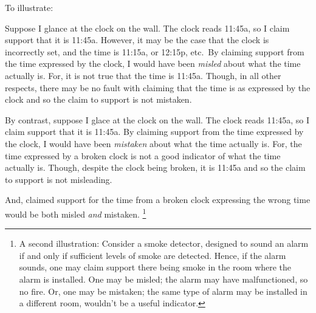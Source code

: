 \begin{note}[M\&M Illustration]
  To illustrate:

  Suppose I glance at the clock on the wall.
  The clock reads 11:45a, so I claim support that it is 11:45a.
  However, it may be the case that the clock is incorrectly set, and the time is 11:15a, or 12:15p, etc.\
  By claiming support from the time expressed by the clock, I would have been \emph{misled} about what the time actually is.
  For, it is not true that the time is 11:45a.
  Though, in all other respects, there may be no fault with claiming that the time is as expressed by the clock and so the claim to support is not mistaken.

  By contrast, suppose I glace at the clock on the wall.
  The clock reads 11:45a, so I claim support that it is 11:45a.
  By claiming support from the time expressed by the clock, I would have been \emph{mistaken} about what the time actually is.
  For, the time expressed by a broken clock is not a good indicator of what the time actually is.
  Though, despite the clock being broken, it is 11:45a and so the claim to support is not misleading.

  And, claimed support for the time from a broken clock expressing the wrong time would be both misled \emph{and} mistaken.\nolinebreak
  \footnote{
    A second illustration:
    Consider a smoke detector, designed to sound an alarm if and only if sufficient levels of smoke are detected.
    Hence, if the alarm sounds, one may claim support there being smoke in the room where the alarm is installed.
    One may be misled; the alarm may have malfunctioned, so no fire.
    Or, one may be mistaken; the same type of alarm may be installed in a different room, wouldn't be a useful indicator.
  }
\end{note}

